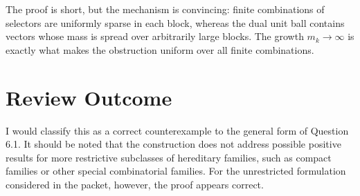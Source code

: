 ﻿\documentclass[11pt]{article}
\begin{document}
The proof is short, but the mechanism is convincing: finite combinations of selectors are uniformly sparse in each block, whereas the dual unit ball contains vectors whose mass is spread over arbitrarily large blocks.  The growth \(m_k\to\infty\) is exactly what makes the obstruction uniform over all finite combinations.

\section*{Review Outcome}

I would classify this as a correct counterexample to the general form of Question 6.1.  It should be noted that the construction does not address possible positive results for more restrictive subclasses of hereditary families, such as compact families or other special combinatorial families.  For the unrestricted formulation considered in the packet, however, the proof appears correct.
\end{document}
